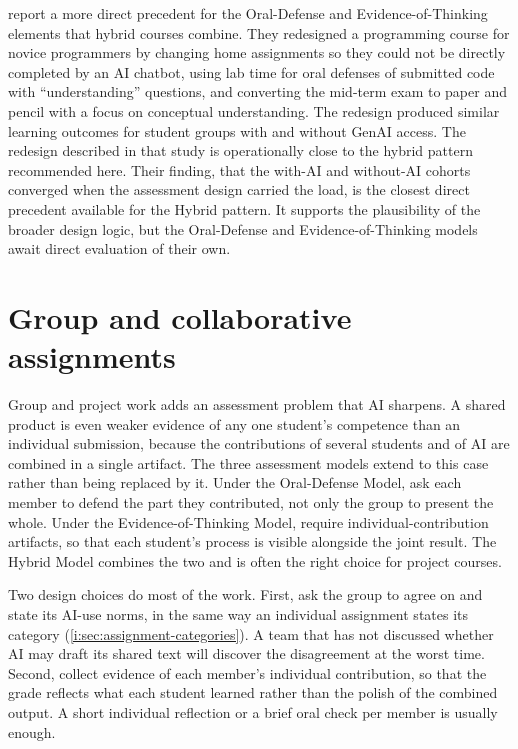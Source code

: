 \documentclass{SIAMbook2023}
\begin{document}
\citet{kosar2024computer} report a more direct precedent for the Oral-Defense and Evidence-of-Thinking elements that hybrid courses combine. They redesigned a programming course for novice programmers by changing home assignments so they could not be directly completed by an AI chatbot, using lab time for oral defenses of submitted code with ``understanding'' questions, and converting the mid-term exam to paper and pencil with a focus on conceptual understanding. The redesign produced similar learning outcomes for student groups with and without GenAI access. The redesign described in that study is operationally close to the hybrid pattern recommended here. Their finding, that the with-AI and without-AI cohorts converged when the assessment design carried the load, is the closest direct precedent available for the Hybrid pattern. It supports the plausibility of the broader design logic, but the Oral-Defense and Evidence-of-Thinking models await direct evaluation of their own.

\section{Group and collaborative assignments}
\label{i:sec:group-assignments}%

Group and project work adds an assessment problem that AI sharpens. A shared product is even weaker evidence of any one student's competence than an individual submission, because the contributions of several students and of AI are combined in a single artifact. The three assessment models extend to this case rather than being replaced by it. Under the Oral-Defense Model, ask each member to defend the part they contributed, not only the group to present the whole. Under the Evidence-of-Thinking Model, require individual-contribution artifacts, so that each student's process is visible alongside the joint result. The Hybrid Model combines the two and is often the right choice for project courses.

Two design choices do most of the work. First, ask the group to agree on and state its AI-use norms, in the same way an individual assignment states its category (\cref{i:sec:assignment-categories}). A team that has not discussed whether AI may draft its shared text will discover the disagreement at the worst time. Second, collect evidence of each member's individual contribution, so that the grade reflects what each student learned rather than the polish of the combined output. A short individual reflection or a brief oral check per member is usually enough.
\end{document}
